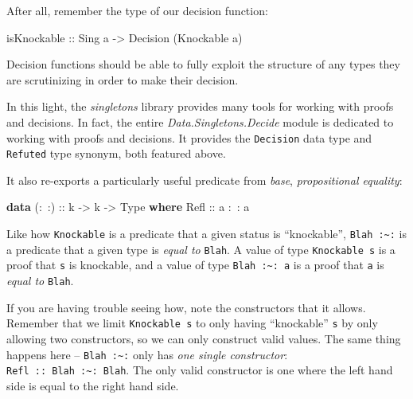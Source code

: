 \documentclass[]{article}
\newenvironment{Shaded}{}{}
\newcommand{\DataTypeTok}[1]{\textcolor[rgb]{0.56,0.13,0.00}{#1}}
\newcommand{\FunctionTok}[1]{\textcolor[rgb]{0.02,0.16,0.49}{#1}}
\newcommand{\KeywordTok}[1]{\textcolor[rgb]{0.00,0.44,0.13}{\textbf{#1}}}
\newcommand{\NormalTok}[1]{#1}
\newcommand{\OtherTok}[1]{\textcolor[rgb]{0.00,0.44,0.13}{#1}}
\begin{document}
After all, remember the type of our decision function:

\begin{Shaded}
\begin{Highlighting}[]
\OtherTok{isKnockable ::} \DataTypeTok{Sing}\NormalTok{ a }\OtherTok{->} \DataTypeTok{Decision}\NormalTok{ (}\DataTypeTok{Knockable}\NormalTok{ a)}
\end{Highlighting}
\end{Shaded}

Decision functions should be able to fully exploit the structure of any types
they are scrutinizing in order to make their decision.

In this light, the \emph{singletons} library provides many tools for working
with proofs and decisions. In fact, the entire \emph{Data.Singletons.Decide}
module is dedicated to working with proofs and decisions. It provides the
\texttt{Decision} data type and \texttt{Refuted} type synonym, both featured
above.

It also re-exports a particularly useful predicate from \emph{base},
\emph{propositional equality}:

\begin{Shaded}
\begin{Highlighting}[]
\KeywordTok{data}\OtherTok{ (:~:) ::}\NormalTok{ k }\OtherTok{->}\NormalTok{ k }\OtherTok{->} \DataTypeTok{Type} \KeywordTok{where}
    \DataTypeTok{Refl}\OtherTok{ ::}\NormalTok{ a }\FunctionTok{:~:}\NormalTok{ a}
\end{Highlighting}
\end{Shaded}

Like how \texttt{Knockable} is a predicate that a given status is ``knockable'',
\texttt{\textquotesingle{}Blah\ :\textasciitilde{}:} is a predicate that a given
type is \emph{equal to} \texttt{\textquotesingle{}Blah}. A value of type
\texttt{Knockable\ s} is a proof that \texttt{s} is knockable, and a value of
type \texttt{\textquotesingle{}Blah\ :\textasciitilde{}:\ a} is a proof that
\texttt{a} is \emph{equal to} \texttt{\textquotesingle{}Blah}.

If you are having trouble seeing how, note the constructors that it allows.
Remember that we limit \texttt{Knockable\ s} to only having ``knockable''
\texttt{s} by only allowing two constructors, so we can only construct valid
values. The same thing happens here --
\texttt{\textquotesingle{}Blah\ :\textasciitilde{}:} only has \emph{one single
constructor}:
\texttt{Refl\ ::\ \textquotesingle{}Blah\ :\textasciitilde{}:\ \textquotesingle{}Blah}.
The only valid constructor is one where the left hand side is equal to the right
hand side.
\end{document}
